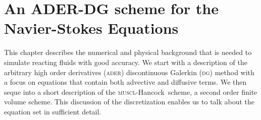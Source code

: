 
\newcommand{\Q}{\bm{Q}}
\newcommand{\gradQ}{\gradient{\Q}}
\newcommand{\Qrho}{\rho}
\newcommand{\Qj}{\rho \bm{v}}
\newcommand{\Qv}{\bm{v}}
\newcommand{\QE}{\rho E}
\newcommand{\QZZ}{Z} %
\newcommand{\QZ}{\rho \QZZ}
\newcommand{\potT}{\theta}
\newcommand{\backgroundPotT}{\overline{\theta}}
\newcommand{\pertubationPotT}{\theta'}
\newcommand{\stressT}{\bm{\sigma}}
\newcommand{\pressure}{p}
\newcommand{\maxConvEigen}[1][]{
  \vert%
  \lambda_c^{\text{max}}
  \notblank{#1}{\left(#1\right)}{}
  \vert%
}
\newcommand{\maxViscEigen}[1][]{
  \vert%
  \lambda_v^{\text{max}}
  \notblank{#1}{\left(#1\right)}{}
  \vert%
}
\newcommand{\Riemann}{\operatorname{Riemann}}

\newcommand{\domain}{\Omega}
\newcommand{\broken}{\domain}
\newcommand{\cell}[1][i]{C_{#1}}
\newcommand{\boundary}{\partial \domain}
\newcommand{\sbasis}[1][]{\Phi_{#1}}
\newcommand{\stbasis}[1][]{\Theta_{#1}}
\newcommand{\sbasisRef}[1][]{\hat{\sbasis[#1]}}
\newcommand{\stbasisRef}[1][]{\hat{\stbasis[#1]}}
\newcommand{\stestfunction}[1]{\sbasis[#1]}
\newcommand{\sttestfunction}[1]{\stbasis[#1]}
\newcommand{\normal}{\bm{n}}
\newcommand{\dsol}[1][h]{\bm{u}_{#1}}
\newcommand{\stpredictor}[1][h]{\bm{q}_{#1}}

\newcommand{\flux}{F}
\newcommand{\viscFlux}{\flux^{v}}
\newcommand{\hyperFlux}{\flux^{h}}
\newcommand{\source}[1][]{
  \notblank{#1}{
S_{#1}
}{
\bm{S}
}
}

\newcommand{\intdt}[1]{\int_{t^n}^{t^{n+1}} #1 \dd{t}}
\newcommand{\intdcell}[1]{\int_{\cell} #1 \dd{\bm{x}}}
\newcommand{\intdrefcell}[1]{\int_{\cell} #1 \dd{\hat{\bm{x}}}}
\newcommand{\intdcellb}[1]{\int_{\partial{} \cell} #1 \dd{S}} %
\newcommand{\intdrefcellb}[1]{\int_{\partial{} \cell} #1 \hat{\dd{S}}} %

\newcommand{\muscl}{\textsc{muscl}-Hancock}
\newcommand{\dg}{\textsc{dg}}
\newcommand{\ader}{\textsc{ader}}
\newcommand{\aderdg}{\textsc{ader-dg}}
\newcommand{\amr}{\textsc{amr}}
\newcommand{\pde}{\textsc{pde}}

\newcommand{\quadWeight}[1][i]{w_{#1}}

\chapter{An ADER-DG scheme for the Navier-Stokes Equations}\label{chap:methods}
This chapter describes the numerical and physical background that is needed to simulate reacting fluids with good accuracy.
We start with a description of the arbitrary high order derivatives (\ader) discontinuous Galerkin (\dg) method with a focus on equations that contain both advective and diffusive terms.
We then seque into a short description of the \muscl\ scheme, a second order finite volume scheme.
This discussion of the discretization enables us to talk about the equation set in sufficient detail.

